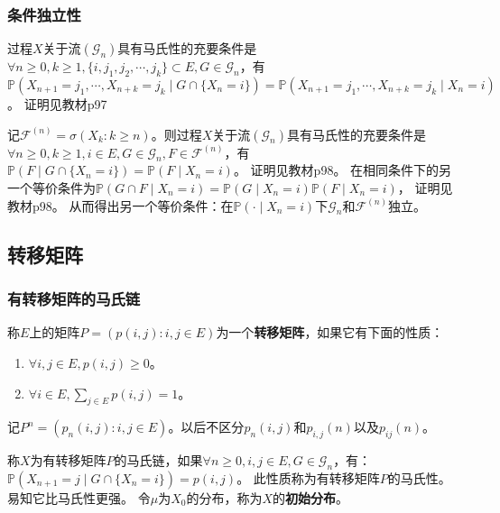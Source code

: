 \documentclass[main]{subfiles}
\begin{document}
\subsubsection{条件独立性}
\begin{theorem}\label{the:markov_property_2}
  过程\(X\)关于流\((\mathcal{G}_n)\)具有马氏性的充要条件是\(\forall n \geq 0,k \geq 1,\{i,j_1,j_2,\cdots,j_k\} \subset E,G \in \mathcal{G}_n\)，有
  \(\mathbb{P}(X_{n+1}=j_1,\cdots,X_{n+k}=j_{k} \mid G \cap \{X_n=i\})=\mathbb{P}(X_{n+1}=j_1,\cdots,X_{n+k}=j_k \mid X_n=i)\)。
  证明见教材p97
\end{theorem}
\begin{theorem}\label{the:tnjmdulixk}
  记\(\mathcal{F}^{(n)}=\sigma(X_k:k \geq n)\)。则过程\(X\)关于流\((\mathcal{G}_n)\)具有马氏性的充要条件是
  \(\forall n \geq 0,k \geq 1,i \in E,G \in \mathcal{G}_n,F \in \mathcal{F}^{(n)}\)，有
  \(\mathbb{P}(F \mid G \cap \{X_n=i\})=\mathbb{P}(F \mid X_n=i)\)。
  证明见教材p98。
  在相同条件下的另一个等价条件为\(\mathbb{P}(G \cap F \mid X_n =i)=\mathbb{P}(G \mid X_n=i)\mathbb{P}(F \mid X_n=i)\)，
  证明见教材p98。
  从而得出另一个等价条件：在\(\mathbb{P}(\cdot \mid X_n=i)\)下\(\mathcal{G}_n\)和\(\mathcal{F}^{(n)}\)独立。
\end{theorem}
\subsection{转移矩阵}
\subsubsection{有转移矩阵的马氏链}
\begin{definition}\label{def:trans_matrix}
  称\(E\)上的矩阵\(P=(p(i,j):i,j \in E)\)为一个\textbf{转移矩阵}，如果它有下面的性质：
  \begin{enumerate}
    \item \(\forall i,j \in E,p(i,j) \geq 0\)。
    \item \(\forall i \in E,\sum_{j \in E}p(i,j)=1\)。
  \end{enumerate}
  记\(P^n=(p_n(i,j):i,j \in E)\)。以后不区分\(p_n(i,j)\)和\(p_{i,j}(n)\)以及\(p_{ij}(n)\)。
\end{definition}
\begin{definition}\label{def:markov_progress_with_trans_matrix}
  称\(X\)为有转移矩阵\(P\)的马氏链，如果\(\forall n \geq 0,i,j \in E,G \in \mathcal{G}_n\)，有：
  \(\mathbb{P}(X_{n+1}=j \mid G \cap \{X_n=i\})=p(i,j)\)。
  此性质称为有转移矩阵\(P\)的马氏性。
  易知它比马氏性更强。
  令\(\mu\)为\(X_0\)的分布，称为\(X\)的\textbf{初始分布}。
\end{definition}
\end{document}
